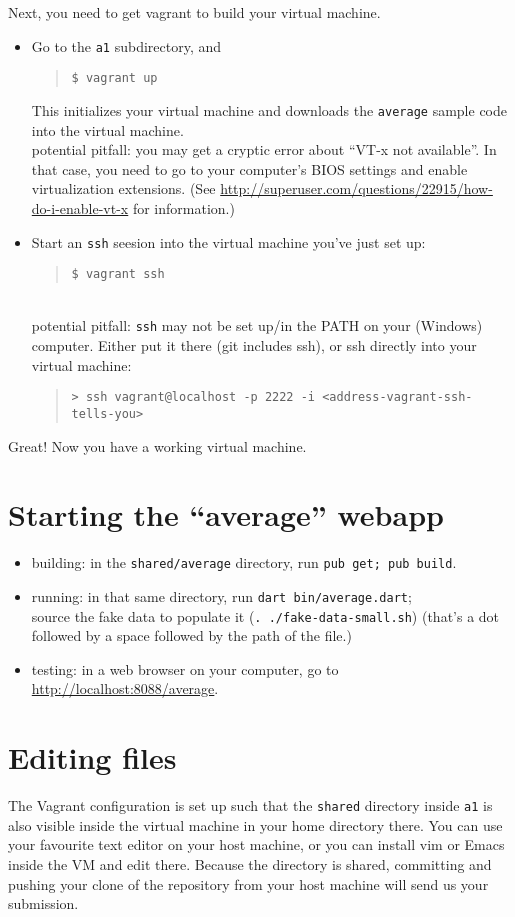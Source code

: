 \documentclass[10pt,hidelinks]{article}
\begin{document}
Next, you need to get vagrant to build your virtual machine.
\begin{itemize}
\item Go to the {\tt a1} subdirectory, and
  \begin{quote}
    \verb+$ vagrant up+
  \end{quote}
  This initializes your virtual machine and downloads the {\tt average} sample code into the virtual machine. \\
  potential pitfall: you may get a cryptic error about ``VT-x not available''. In that case, you need to go to your computer's BIOS settings and enable virtualization extensions. (See \url{http://superuser.com/questions/22915/how-do-i-enable-vt-x} for information.)
\item Start an {\tt ssh} seesion into the virtual machine you've just set up:
  \begin{quote}
    \verb+$ vagrant ssh+
  \end{quote} ~\\[-1em]
  potential pitfall: {\tt ssh} may not be set up/in the PATH on your (Windows) computer. Either put it there (git includes ssh), or ssh directly into your virtual machine:
  \begin{quote}
    \verb+> ssh vagrant@localhost -p 2222 -i <address-vagrant-ssh-tells-you>+
  \end{quote}
\end{itemize}
Great! Now you have a working virtual machine.

\section*{Starting the ``average'' webapp}
\begin{itemize}
\item building: in the {\tt shared/average} directory, run {\tt pub get; pub build}.
\item running: in that same directory, run {\tt dart bin/average.dart}; \\ source the fake data to populate it (\verb+. ./fake-data-small.sh+) (that's a dot followed by a space followed by the path of the file.)
\item testing: in a web browser on your computer, go to \url{http://localhost:8088/average}.
\end{itemize}

\section*{Editing files}
The Vagrant configuration is set up such that the {\tt shared} directory inside 
{\tt a1} is also visible inside the virtual machine in your home directory there.
You can use your favourite text editor on your host machine, or you can install
vim or Emacs inside the VM and edit there. Because the directory is shared, committing
and pushing your clone of the repository from your host machine will send us your submission.
\end{document}
